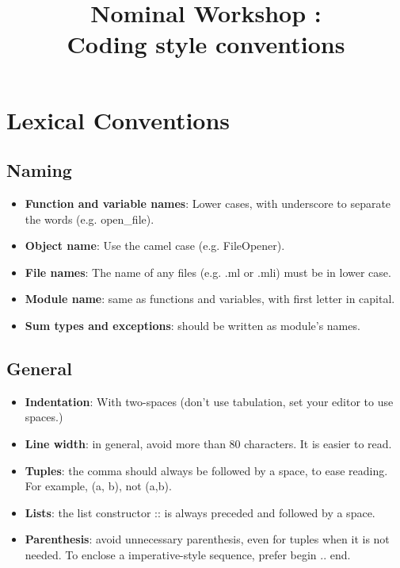 \documentclass{article}
\title{Nominal Workshop : \\
  Coding style conventions}
\begin{document}
\maketitle

\section{Lexical Conventions}

\subsection{Naming}

\medskip

\begin{itemize}
\item \textbf{Function and variable names}: Lower cases, with underscore to 
  separate the words (e.g. open\_file).
\item \textbf{Object name}: Use the camel case (e.g. FileOpener).
\item \textbf{File names}: The name of any files (e.g. .ml or .mli) must be in
  lower case.
\item \textbf{Module name}: same as functions and variables, with first letter
  in capital. 
\item \textbf{Sum types and exceptions}: should be written as module's names.
\end{itemize}

\subsection{General}

\medskip 

\begin{itemize}
\item \textbf{Indentation}: With two-spaces (don't use tabulation, set your
  editor to use spaces.)
\item \textbf{Line width}: in general, avoid more than 80 characters. It is
  easier to read.
\item \textbf{Tuples}: the comma should always be followed by a space, to ease
  reading. For example, \textsf{(a, b)}, not \textsf{(a,b)}.
\item \textbf{Lists}: the list constructor \textsf{::} is always preceded and
  followed by a space.
\item \textbf{Parenthesis}: avoid unnecessary parenthesis, even for tuples when
  it is not needed. To enclose a imperative-style sequence, prefer \textsf{begin
    .. end}.
\end{itemize}
\end{document}
